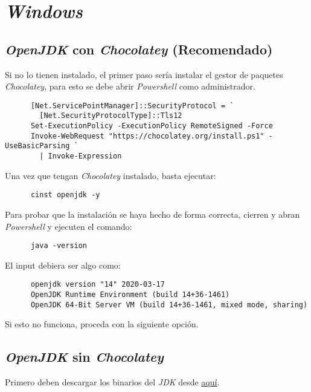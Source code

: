 \section{\textit{Windows}}
  \subsection{\textit{OpenJDK} con \textit{Chocolatey} (Recomendado)}
    Si no lo tienen instalado, el primer paso sería instalar el gestor de paquetes 
    \textit{Chocolatey}, para esto se debe abrir \textit{Powershell} como 
    administrador.

    \begin{verbatim}
      [Net.ServicePointManager]::SecurityProtocol = `
        [Net.SecurityProtocolType]::Tls12
      Set-ExecutionPolicy -ExecutionPolicy RemoteSigned -Force
      Invoke-WebRequest "https://chocolatey.org/install.ps1" -UseBasicParsing `
        | Invoke-Expression
    \end{verbatim}

    Una vez que tengan \textit{Chocolatey} instalado, basta ejecutar:

    \begin{verbatim}
      cinst openjdk -y
    \end{verbatim}

    Para probar que la instalación se haya hecho de forma correcta, cierren y abran 
    \textit{Powershell} y ejecuten el comando:

    \begin{verbatim}
      java -version
    \end{verbatim}

    El input debiera ser algo como:

    \begin{verbatim}
      openjdk version "14" 2020-03-17
      OpenJDK Runtime Environment (build 14+36-1461)
      OpenJDK 64-Bit Server VM (build 14+36-1461, mixed mode, sharing)
    \end{verbatim}

    Si esto no funciona, proceda con la siguiente opción.

  \subsection{\textit{OpenJDK} sin \textit{Chocolatey}}
    Primero deben descargar los binarios del \textit{JDK} desde 
    \href{
      https://download.java.net/java/GA/jdk14/076bab302c7b4508975440c56f6cc26a/36/GPL/openjdk-14_windows-x64_bin.zip
      }{aquí}.
    
